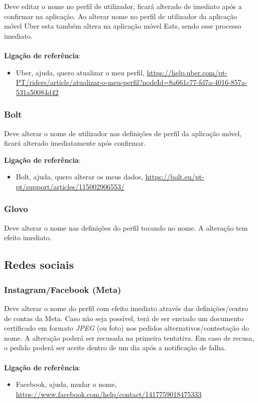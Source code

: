 Deve editar o nome no perfil de utilizador, ficará alterado de imediato
após a confirmar na aplicação. Ao alterar nome no perfil de utilizador
da aplicação móvel Uber esta também altera na aplicação móvel Eats,
sendo esse processo imediato. \\
\\
\textbf{Ligação de referência}:
\begin{itemize}
	\item Uber, ajuda, quero atualizar o meu perfil, \url{https://help.uber.com/pt-PT/riders/article/atualizar-o-meu-perfil?nodeId=8a661c77-fd7a-4016-857a-531a50084d42}
\end{itemize}

\subsubsection{Bolt}

Deve alterar o nome de utilizador nas definições de perfil da aplicação
móvel, ficará alterado imediatamente após confirmar.

\textbf{Ligação de referência}:
\begin{itemize}
	\item Bolt, ajuda, quero alterar os meus dados, \url{https://bolt.eu/pt-pt/support/articles/115002906553/}
\end{itemize}

\subsubsection{Glovo}

Deve alterar o nome nas definições do perfil tocando no nome. A
alteração tem efeito imediato.

\subsection{Redes sociais}

\subsubsection{Instagram/Facebook (Meta)}

Deve alterar o nome do perfil com efeito imediato através das
definições/centro de contas da Meta. Caso não seja possível, terá de ser
enviado um documento certificado em formato \emph{JPEG} (ou foto) nos
pedidos alternativos/contestação do nome. A alteração poderá ser
recusada na primeira tentativa. Em caso de recusa, o pedido poderá ser
aceite dentro de um dia após a notificação de falha. \\
\\
\textbf{Ligação de referência}:
\begin{itemize}
	\item Facebook, ajuda, mudar o nome, \url{https://www.facebook.com/help/contact/1417759018475333}
\end{itemize}

